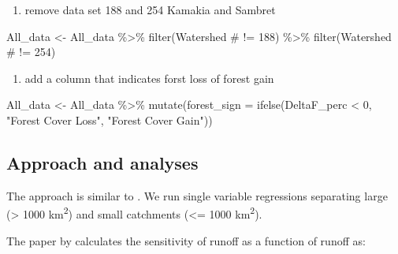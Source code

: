\documentclass[]{elsarticle} %
\newenvironment{Shaded}{\begin{snugshade}}{\end{snugshade}}
\newcommand{\AttributeTok}[1]{\textcolor[rgb]{0.77,0.63,0.00}{#1}}
\newcommand{\DecValTok}[1]{\textcolor[rgb]{0.00,0.00,0.81}{#1}}
\newcommand{\FunctionTok}[1]{\textcolor[rgb]{0.00,0.00,0.00}{#1}}
\newcommand{\NormalTok}[1]{#1}
\newcommand{\OtherTok}[1]{\textcolor[rgb]{0.56,0.35,0.01}{#1}}
\newcommand{\SpecialCharTok}[1]{\textcolor[rgb]{0.00,0.00,0.00}{#1}}
\newcommand{\StringTok}[1]{\textcolor[rgb]{0.31,0.60,0.02}{#1}}
\providecommand{\tightlist}{%
  \setlength{\itemsep}{0pt}\setlength{\parskip}{0pt}}
\begin{document}
\begin{enumerate}
\def\labelenumi{\arabic{enumi}.}
\setcounter{enumi}{3}
\tightlist
\item
  remove data set 188 and 254 Kamakia and Sambret
\end{enumerate}

\begin{Shaded}
\begin{Highlighting}[]
\NormalTok{All\_data }\OtherTok{\textless{}{-}}\NormalTok{ All\_data }\SpecialCharTok{\%\textgreater{}\%}
  \FunctionTok{filter}\NormalTok{(}\StringTok{\textasciigrave{}}\AttributeTok{Watershed \#}\StringTok{\textasciigrave{}} \SpecialCharTok{!=} \DecValTok{188}\NormalTok{) }\SpecialCharTok{\%\textgreater{}\%}
  \FunctionTok{filter}\NormalTok{(}\StringTok{\textasciigrave{}}\AttributeTok{Watershed \#}\StringTok{\textasciigrave{}} \SpecialCharTok{!=} \DecValTok{254}\NormalTok{)}
\end{Highlighting}
\end{Shaded}

\begin{enumerate}
\def\labelenumi{\arabic{enumi}.}
\setcounter{enumi}{4}
\tightlist
\item
  add a column that indicates forst loss of forest gain
\end{enumerate}

\begin{Shaded}
\begin{Highlighting}[]
\NormalTok{All\_data }\OtherTok{\textless{}{-}}\NormalTok{ All\_data }\SpecialCharTok{\%\textgreater{}\%}
  \FunctionTok{mutate}\NormalTok{(}\AttributeTok{forest\_sign =} \FunctionTok{ifelse}\NormalTok{(DeltaF\_perc }\SpecialCharTok{\textless{}} \DecValTok{0}\NormalTok{, }\StringTok{"Forest Cover Loss"}\NormalTok{, }\StringTok{"Forest Cover Gain"}\NormalTok{))}
\end{Highlighting}
\end{Shaded}

\hypertarget{approach-and-analyses}{%
\subsection{Approach and analyses}\label{approach-and-analyses}}

The approach is similar to \citet{zhang2017}. We run single variable regressions separating large (\textgreater{} 1000 km\textsuperscript{2}) and small catchments (\textless= 1000 km\textsuperscript{2}).

The paper by \citet{zhang2017} calculates the sensitivity of runoff as a function of runoff as:
\end{document}

